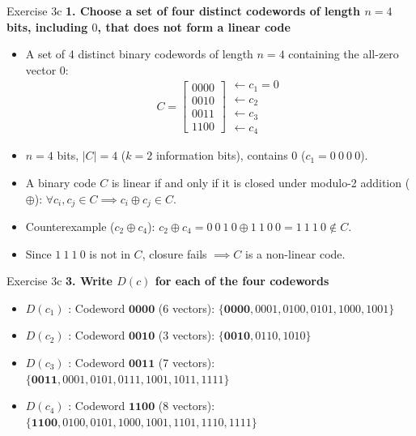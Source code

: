 \documentclass[10pt, aspectratio=169]{beamer}
\newcommand{\question}[1]{{\color{QuestionRed}\textbf{#1}}}
\begin{document}
\begin{frame}{Exercise 3c}
  \question{1. Choose a set of four distinct codewords of length $n = 4$ bits, including $0$, that does not form a linear code}

  \vspace{0.15cm}
  \small
  \begin{itemize}
    \item A set of 4 distinct binary codewords of length $n = 4$ containing the all-zero vector $0$:
    \[
      C = \begin{bmatrix} 0000 \\ 0010 \\ 0011 \\ 1100 \end{bmatrix}
      \begin{array}{l}
        \leftarrow c_1 = 0 \\ \leftarrow c_2 \\ \leftarrow c_3 \\ \leftarrow c_4
      \end{array}
    \]
    \item $n = 4$ bits, $|C| = 4$ ($k = 2$ information bits), contains $0$ ($c_1 = 0\ 0\ 0\ 0$).
    \item A binary code $C$ is linear if and only if it is closed under modulo-2 addition ($\oplus$): $\forall c_i, c_j \in C \implies c_i \oplus c_j \in C$.
    \item Counterexample ($c_2 \oplus c_4$): $c_2 \oplus c_4 = 0\ 0\ 1\ 0 \oplus 1\ 1\ 0\ 0 = 1\ 1\ 1\ 0 \notin C$.
    \item Since $1\ 1\ 1\ 0$ is not in $C$, closure fails $\implies C$ is a non-linear code.
  \end{itemize}
\end{frame}

\begin{frame}{Exercise 3c}
  \question{3. Write $D(c)$ for each of the four codewords}

  \vspace{0.25cm}
  \begin{itemize}
    \item $D(c_1)$ : Codeword $\mathbf{0000}$ (6 vectors): $\{\mathbf{0000}, 0001, 0100, 0101, 1000, 1001\}$
    \item $D(c_2)$ : Codeword $\mathbf{0010}$ (3 vectors): $\{\mathbf{0010}, 0110, 1010\}$
    \item $D(c_3)$ : Codeword $\mathbf{0011}$ (7 vectors): $\{\mathbf{0011}, 0001, 0101, 0111, 1001, 1011, 1111\}$
    \item $D(c_4)$ : Codeword $\mathbf{1100}$ (8 vectors): $\{\mathbf{1100}, 0100, 0101, 1000, 1001, 1101, 1110, 1111\}$
  \end{itemize}
\end{frame}
\end{document}
